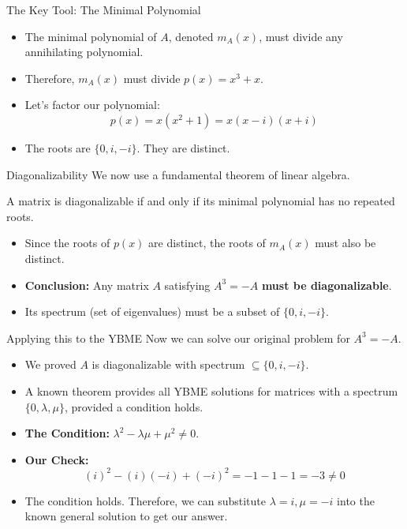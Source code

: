 \documentclass{beamer}
\begin{document}
\begin{frame}{The Key Tool: The Minimal Polynomial}
  \begin{itemize}
    \item The minimal polynomial of $A$, denoted $m_A(x)$, must divide any annihilating polynomial.
    \item Therefore, $m_A(x)$ must divide $p(x) = x^3 + x$.
    \pause %
    \item Let's factor our polynomial:
    \[ p(x) = x(x^2 + 1) = x(x-i)(x+i) \]
    \pause
    \item The roots are $\{0, i, -i\}$. They are distinct.
  \end{itemize}
\end{frame}

\begin{frame}{Diagonalizability}
  We now use a fundamental theorem of linear algebra.
  \begin{theorem}
    A matrix is diagonalizable if and only if its minimal polynomial has no repeated roots.
  \end{theorem}
  \vfill
  \begin{itemize}
    \item Since the roots of $p(x)$ are distinct, the roots of $m_A(x)$ must also be distinct.
    \pause
    \item \textbf{Conclusion:} Any matrix $A$ satisfying $A^3 = -A$ \textbf{must be diagonalizable}.
    \item Its spectrum (set of eigenvalues) must be a subset of $\{0, i, -i\}$.
  \end{itemize}
\end{frame}

\begin{frame}{Applying this to the YBME}
  Now we can solve our original problem for $A^3 = -A$.
  \begin{itemize}
    \item We proved $A$ is diagonalizable with spectrum $\subseteq \{0, i, -i\}$.
    \item A known theorem provides all YBME solutions for matrices with a spectrum $\{0, \lambda, \mu\}$, provided a condition holds. \cite{tripotent}
    \pause
    \item \textbf{The Condition:} $\lambda^2 - \lambda\mu + \mu^2 \neq 0$.
    \pause
    \item \textbf{Our Check:}
    \[ (i)^2 - (i)(-i) + (-i)^2 = -1 - 1 - 1 = -3 \neq 0 \]
    \item The condition holds. Therefore, we can substitute $\lambda=i, \mu=-i$ into the known general solution to get our answer.
  \end{itemize}
\end{frame}
\end{document}

